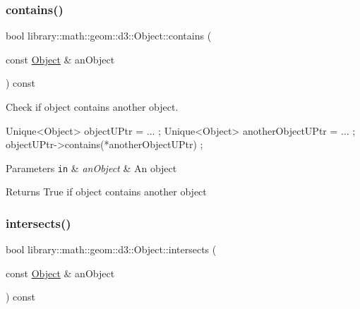 \subsubsection{\texorpdfstring{contains()}{contains()}}
{\footnotesize\ttfamily bool library\+::math\+::geom\+::d3\+::\+Object\+::contains (\begin{DoxyParamCaption}\item[{const \hyperlink{classlibrary_1_1math_1_1geom_1_1d3_1_1_object}{Object} \&}]{an\+Object }\end{DoxyParamCaption}) const\hspace{0.3cm}{\ttfamily [virtual]}}



Check if object contains another object. 


\begin{DoxyCode}
Unique<Object> objectUPtr = ... ;
Unique<Object> anotherObjectUPtr = ... ;
objectUPtr->contains(*anotherObjectUPtr) ;
\end{DoxyCode}



\begin{DoxyParams}[1]{Parameters}
\mbox{\tt in}  & {\em an\+Object} & An object \\
\hline
\end{DoxyParams}
\begin{DoxyReturn}{Returns}
True if object contains another object 
\end{DoxyReturn}
\mbox{\label{classlibrary_1_1math_1_1geom_1_1d3_1_1_object_a98c37b46f2fdc5f22bc123a757dcf73e}} 
\subsubsection{\texorpdfstring{intersects()}{intersects()}}
{\footnotesize\ttfamily bool library\+::math\+::geom\+::d3\+::\+Object\+::intersects (\begin{DoxyParamCaption}\item[{const \hyperlink{classlibrary_1_1math_1_1geom_1_1d3_1_1_object}{Object} \&}]{an\+Object }\end{DoxyParamCaption}) const\hspace{0.3cm}{\ttfamily [virtual]}}



